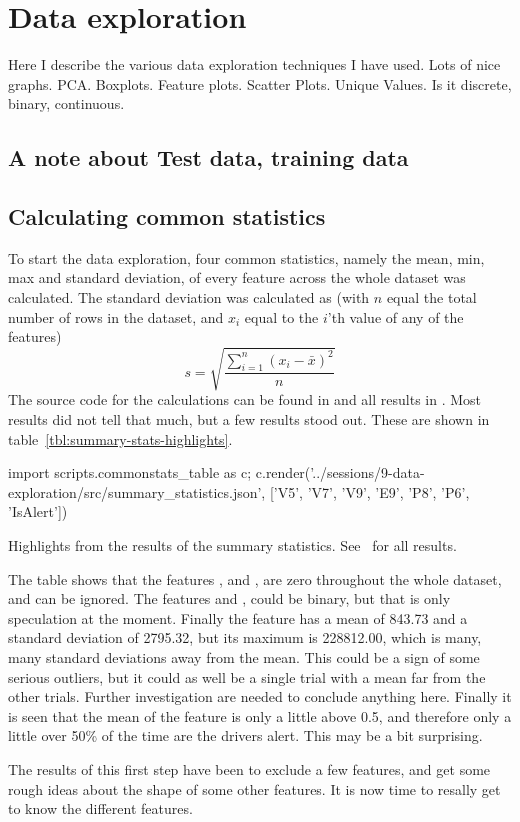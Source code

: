 \chapter{Data exploration}
Here I describe the various data exploration techniques I have used. Lots of nice graphs. PCA. Boxplots. Feature plots. Scatter Plots. Unique Values. Is it discrete, binary, continuous.

\section{A note about Test data, training data}

\section{Calculating common statistics}
To start the data exploration, four common statistics, namely the mean, min, max and standard deviation, of every feature across the whole dataset was calculated. The standard deviation was calculated as (with $n$ equal the total number of rows in the dataset, and $x_i$ equal to the $i$'th value of any of the features)
\[
    s = \sqrt{\frac{\sum_{i=1}^n (x_i-\bar{x})^2}{n}}
\]
The source code for the calculations can be found in  and all results in . Most results did not tell that much, but a few results stood out. These are shown in table~\ref{tbl:summary-stats-highlights}.
\begin{table}
    {\small\sffamily
        \begin{python}
            import scripts.commonstats_table as c; c.render('../sessions/9-data-exploration/src/summary_statistics.json', ['V5', 'V7', 'V9', 'E9', 'P8', 'P6', 'IsAlert'])
        \end{python}
    }
    \caption{Highlights from the results of the summary statistics. See~ for all results.}
    \label{tbl:summary-stats-highlights}
\end{table}
The table shows that the features ,  and , are zero throughout the whole dataset, and can be ignored. The features  and , could be binary, but that is only speculation at the moment. Finally the feature  has a mean of 843.73 and a standard deviation of 2795.32, but its maximum is 228812.00, which is many, many standard deviations away from the mean. This could be a sign of some serious outliers, but it could as well be a single trial with a mean far from the other trials. Further investigation are needed to conclude anything here. Finally it is seen that the mean of the  feature is only a little above 0.5, and therefore only a little over 50\% of the time are the drivers alert. This may be a bit surprising. \par
The results of this first step have been to exclude a few features, and get some rough ideas about the shape of some other features. It is now time to resally get to know the different features.

